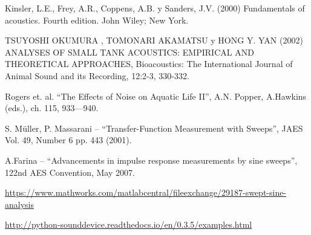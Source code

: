 \begin{thebibliography}{10}

    Kinsler, L.E., Frey, A.R., Coppens, A.B. y Sanders, J.V. (2000) Fundamentals of acoustics. Fourth edition. John Wiley; New York.

    TSUYOSHI OKUMURA , TOMONARI AKAMATSU y
HONG Y. YAN (2002) ANALYSES OF SMALL TANK ACOUSTICS: EMPIRICAL
AND THEORETICAL APPROACHES, Bioacoustics: The International
Journal of Animal Sound and its Recording, 12:2-3, 330-332.

    Rogers et. al. “The Effects of Noise on Aquatic Life II”, A.N. Popper, A.Hawkins (eds.), ch. 115, 933—940.

    S. Müller, P. Massarani – “Transfer-Function
Measurement with Sweeps”, JAES Vol. 49,
Number 6 pp. 443 (2001).

     A.Farina – “Advancements in impulse response
measurements by sine sweeps”, 122nd AES Convention, May 2007.

	\url{https://www.mathworks.com/matlabcentral/fileexchange/29187-swept-sine-analysis}

	\url{http://python-sounddevice.readthedocs.io/en/0.3.5/examples.html}

\end{thebibliography}